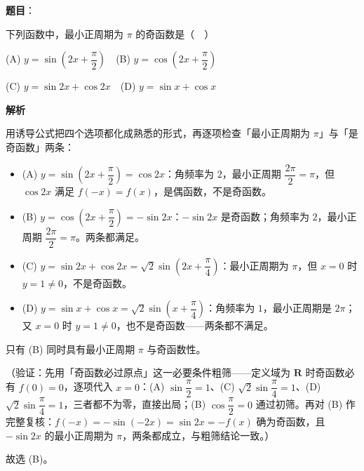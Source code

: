 \begin{answer}

\textbf{题目}：

下列函数中，最小正周期为 \(\pi\) 的奇函数是（　）

(A) \(y=\sin\left(2x+\dfrac{\pi}{2}\right)\)　(B) \(y=\cos\left(2x+\dfrac{\pi}{2}\right)\)

(C) \(y=\sin 2x+\cos 2x\)　(D) \(y=\sin x+\cos x\)

\textbf{解析}

用诱导公式把四个选项都化成熟悉的形式，再逐项检查「最小正周期为 \(\pi\)」与「是奇函数」两条：

\begin{itemize}
\item (A) \(y=\sin\left(2x+\dfrac{\pi}{2}\right)=\cos2x\)：角频率为 \(2\)，最小正周期 \(\dfrac{2\pi}{2}=\pi\)，但 \(\cos2x\) 满足 \(f(-x)=f(x)\)，是偶函数，不是奇函数。
\item (B) \(y=\cos\left(2x+\dfrac{\pi}{2}\right)=-\sin2x\)：\(-\sin2x\) 是奇函数；角频率为 \(2\)，最小正周期 \(\dfrac{2\pi}{2}=\pi\)。两条都满足。
\item (C) \(y=\sin2x+\cos2x=\sqrt{2}\sin\left(2x+\dfrac{\pi}{4}\right)\)：最小正周期为 \(\pi\)，但 \(x=0\) 时 \(y=1\neq0\)，不是奇函数。
\item (D) \(y=\sin x+\cos x=\sqrt{2}\sin\left(x+\dfrac{\pi}{4}\right)\)：角频率为 \(1\)，最小正周期是 \(2\pi\)；又 \(x=0\) 时 \(y=1\neq0\)，也不是奇函数——两条都不满足。
\end{itemize}

只有 (B) 同时具有最小正周期 \(\pi\) 与奇函数性。

（验证：先用「奇函数必过原点」这一必要条件粗筛——定义域为 \(\mathbf{R}\) 时奇函数必有 \(f(0)=0\)，逐项代入 \(x=0\)：(A) \(\sin\dfrac{\pi}{2}=1\)、(C) \(\sqrt{2}\sin\dfrac{\pi}{4}=1\)、(D) \(\sqrt{2}\sin\dfrac{\pi}{4}=1\)，三者都不为零，直接出局；(B) \(\cos\dfrac{\pi}{2}=0\) 通过初筛。再对 (B) 作完整复核：\(f(-x)=-\sin(-2x)=\sin2x=-f(x)\) 确为奇函数，且 \(-\sin2x\) 的最小正周期为 \(\pi\)，两条都成立，与粗筛结论一致。）

故选 (B)。


\end{answer}
